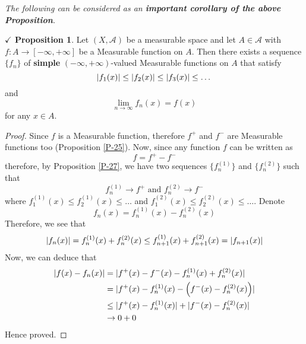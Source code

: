 \documentclass{article}
\theoremstyle{definition}
\theoremstyle{remark}
\theoremstyle{definition}
\theoremstyle{definition}
\newtheorem{proposition}{$\checkmark$ Proposition}
\theoremstyle{definition}
\DeclarePairedDelimiter\abs{\lvert}{\rvert}
\newcommand{\alg}[1]{\mathscr{#1}}
\begin{document}
\emph{The following can be considered as an\textbf{ important corollary of the above Proposition}.}
\begin{proposition}
	Let $ (X,\alg{A}) $ be a measurable space and let $ A \in \alg{A} $ with $ f :A\to[-\infty	,+\infty] $ be a Measurable function on $ A $. Then there exists a sequence $ \{f_n\} $ of \textbf{simple} $ (-\infty,+\infty) $-valued Measurable functions on $ A $ that satisfy 
	\[\abs{f_1(x)}\le \abs{f_2(x)}\le \abs{f_3(x)}\le \dots\]
	and 
	\[\lim_{n\to\infty } f_{n}(x) = f(x)\]
	for any $ x\in A $.
\end{proposition}
\begin{proof}
	 	Since $ f $ is a Measurable function, therefore $ f^{+} $ and $ f^{-} $ are Measurable functions too (Proposition \ref{P-25}). Now, since any function $ f $ can be written as 
	 	\[f = f^{+} - f^{-}\]
	 	therefore, by Proposition \ref{P-27}, we have two sequences $ \{f_n^{(1)}\} $ and $ \{f_n^{(2)}\} $ such that
	 	\[f_n^{(1)}\longrightarrow f^{+}\text{ and }f_n^{(2)}\longrightarrow f^{-}\]
		where $ f_1^{(1)}(x) \le f_2^{(1)}(x)\le \dots $ and $f_1^{(2)}(x) \le f_2^{(2)}(x) \le \dots $. Denote 
		\[f_n(x) = f_n^{(1)}(x) - f_n^{(2)}(x) \]
		Therefore, we see that
		 \[\abs{f_n(x)} = f_n^{(1)}(x) + f_n^{(2)}(x) \le f_{n+1}^{(1)}(x) + f_{n+1}^{(2)}(x) = \abs{f_{n+1}(x)}\]
		Now, we can deduce that
		\begin{equation*}
			\begin{split}
				\abs{f(x) - f_n(x)} &= \abs{f^{+}(x) - f^{-}(x) - f_n^{(1)}(x) + f_n^{(2)}(x) }\\
				&= \abs{f^{+}(x) - f_n^{(1)}(x) - \left (f^{-}(x) - f_n^{(2)}(x)\right )}\\
				&\le  \abs{f^{+}(x) - f_n^{(1)}(x)} + \abs{f^{-}(x) - f_n^{(2)}(x)}\\
				&\to 0 + 0
			\end{split}
		\end{equation*}
	Hence proved.
\end{proof}
\hrulefill
\newpage
\end{document}
